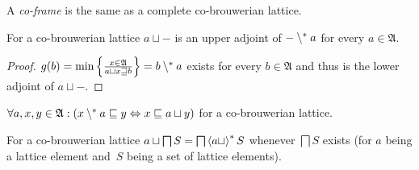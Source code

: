 \begin{defn}
A \emph{co-frame} is the same as a complete co-brouwerian lattice.\end{defn}
\begin{thm}\label{cobrow}
\label{cobrow-adj}For a co-brouwerian lattice $a\sqcup\mathord-$
is an upper adjoint of $\mathord-\setminus^{\ast} a$ for every $a\in\mathfrak{A}$.\end{thm}
\begin{proof}
$g(b)=\min\left\{ \frac{x\in\mathfrak{A}}{a\sqcup x\sqsupseteq b}\right\}=b\setminus^{\ast} a$
exists for every $b\in\mathfrak{A}$ and thus is the lower adjoint
of $a\sqcup\mathord-$.\end{proof}
\begin{cor}
\label{adjoint-brow-full}$\forall a,x,y\in\mathfrak{A}:(x\setminus^{\ast} a\sqsubseteq y\Leftrightarrow x\sqsubseteq a\sqcup y)$
for a co-brouwerian lattice.\end{cor}

\begin{cor}
For a co-brouwerian lattice $a\sqcup\bigsqcap S=
\bigsqcap\left\langle a\sqcup\right\rangle ^{\ast}S$ whenever $\bigsqcap S$
exists (for $a$ being a lattice element and~$S$ being
a set of lattice elements).
\end{cor}


